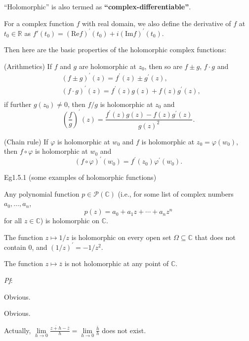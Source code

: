 \documentclass{article}
\begin{document}
\begin{Rmk}{}
    \begin{compactenum}
        \item \textcolor{Df}{``Holomorphic'' is also termed as \textbf{``complex-differentiable''}.}
        \item \textcolor{Df}{For a complex function $f$ with real domain, we also define the derivative of $f$ at $t_0\in\mathbb{R}$ as $f'(t_0) = (\text{Re}f)^\prime(t_0) + i(\text{Im}f)^\prime(t_0)$.}
    \end{compactenum}
    Then here are the basic properties of the holomorphic complex functions: \textcolor{Th}{
    \begin{compactenum}
        \item (Arithmetics) If $f$ and $g$ are holomorphic at $z_0$, then so are $f\pm g$, $f\cdot g$ and
        $$ \begin{aligned}
            & (f \pm g)^\prime(z) = f^\prime(z) \pm g^\prime(z),\\
            & (f\cdot g)^\prime(z) = f^\prime(z)g(z) + f(z)g^\prime(z),\\
        \end{aligned} $$
        if further $g(z_0)\neq 0$, then $f/g$ is holomorphic at $z_0$ and 
        $$ \left(\frac{f}{g}\right)^\prime(z) = \frac{f^\prime(z)g(z) - f(z)g^\prime(z)}{g(z)^2}. $$
        \item (Chain rule) If $\varphi$ is holomorphic at $w_0$ and $f$ is holomorphic at $z_0 = \varphi(w_0)$, then $f\circ\varphi$ is holomorphic at $w_0$ and
        $$ (f\circ\varphi)^\prime(w_0) = f^\prime(z_0)\varphi^\prime(w_0). $$
    \end{compactenum}}
\end{Rmk}

\begin{Th}{Eg1.5.1 (some examples of holomorphic functions)}
    \begin{compactenum}
        \item Any polynomial function $p\in\mathcal{P}(\mathbb{C})$ (i.e., for some list of complex numbers $a_0, \dots, a_n$, 
        $$ p(z) = a_0 + a_1z + \cdots + a_nz^n $$
        for all $z\in\mathbb{C}$) is holomorphic on $\mathbb{C}$.
        \item The function $z\mapsto 1/z$ is holomorphic on every open set $\varOmega\subseteq\mathbb{C}$ that does not contain $0$, and $(1/z)^\prime = -1/z^2$.
        \item The function $z\mapsto \overline{z}$ is not holomorphic at any point of $\mathbb{C}$.
    \end{compactenum}
    \tcblower
    \textit{Pf}: 
    \begin{compactenum}
        \item Obvious.
        \item Obvious.
        \item Actually, $\lim\limits_{h\to 0} \frac{\overline{z+h}-\overline{z}}{h} = \lim\limits_{h\to 0} \frac{\overline{h}}{h}$ does not exist.
    \end{compactenum}
\end{Th}
\end{document}
